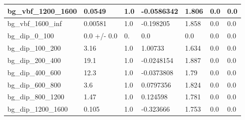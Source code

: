 \documentclass[a4paper, 10pt]{article}
\begin{document}
\begin{table}[H]
\begin{center}
\begin{tabular}{|m{23.0mm}|m{23.0mm}|m{18.0mm}|m{19.0mm}|m{19.0mm}|m{19.0mm}|m{19.0mm}|}
      \hline
      {\cellcolor{white}         bg\_vbf\_1200\_1600}& {\cellcolor{white}         0.0549}& {\cellcolor{white}         1.0}& {\cellcolor{white}         -0.0586342}& {\cellcolor{white}         1.806}& {\cellcolor{green}         0.0}& {\cellcolor{green}         0.0}\\
      \hline
      {\cellcolor{white}         bg\_vbf\_1600\_inf}& {\cellcolor{white}         0.00581}& {\cellcolor{white}         1.0}& {\cellcolor{white}         -0.198205}& {\cellcolor{white}         1.858}& {\cellcolor{green}         0.0}& {\cellcolor{green}         0.0}\\
      \hline
      {\cellcolor{white}         bg\_dip\_0\_100}& {\cellcolor{white}         0.0 +/\-- 0.0}& {\cellcolor{white}         0.}& {\cellcolor{white}         0.0}& {\cellcolor{white}         0.0}& {\cellcolor{green}         0.0}& {\cellcolor{green}         0.0}\\
      \hline
      {\cellcolor{white}         bg\_dip\_100\_200}& {\cellcolor{white}         3.16}& {\cellcolor{white}         1.0}& {\cellcolor{white}         1.00733}& {\cellcolor{white}         1.634}& {\cellcolor{green}         0.0}& {\cellcolor{green}         0.0}\\
      \hline
      {\cellcolor{white}         bg\_dip\_200\_400}& {\cellcolor{white}         19.1}& {\cellcolor{white}         1.0}& {\cellcolor{white}         -0.0248154}& {\cellcolor{white}         1.887}& {\cellcolor{green}         0.0}& {\cellcolor{green}         0.0}\\
      \hline
      {\cellcolor{white}         bg\_dip\_400\_600}& {\cellcolor{white}         12.3}& {\cellcolor{white}         1.0}& {\cellcolor{white}         -0.0373808}& {\cellcolor{white}         1.79}& {\cellcolor{green}         0.0}& {\cellcolor{green}         0.0}\\
      \hline
      {\cellcolor{white}         bg\_dip\_600\_800}& {\cellcolor{white}         3.6}& {\cellcolor{white}         1.0}& {\cellcolor{white}         0.0797356}& {\cellcolor{white}         1.824}& {\cellcolor{green}         0.0}& {\cellcolor{green}         0.0}\\
      \hline
      {\cellcolor{white}         bg\_dip\_800\_1200}& {\cellcolor{white}         1.47}& {\cellcolor{white}         1.0}& {\cellcolor{white}         0.124598}& {\cellcolor{white}         1.781}& {\cellcolor{green}         0.0}& {\cellcolor{green}         0.0}\\
      \hline
      {\cellcolor{white}         bg\_dip\_1200\_1600}& {\cellcolor{white}         0.105}& {\cellcolor{white}         1.0}& {\cellcolor{white}         -0.323666}& {\cellcolor{white}         1.753}& {\cellcolor{green}         0.0}& {\cellcolor{green}         0.0}\\

\end{tabular}
\end{center}
\end{table}
\end{document}
